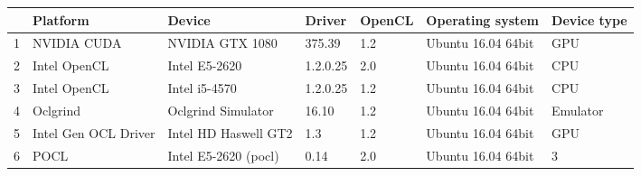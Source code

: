\begin{tabular}{lllllll}
\toprule
{} &              Platform &                Device &    Driver & OpenCL &    Operating system & Device type \\
\midrule
1 &           NVIDIA CUDA &       NVIDIA GTX 1080 &    375.39 &    1.2 &  Ubuntu 16.04 64bit &         GPU \\
2 &          Intel OpenCL &         Intel E5-2620 &  1.2.0.25 &    2.0 &  Ubuntu 16.04 64bit &         CPU \\
3 &          Intel OpenCL &         Intel i5-4570 &  1.2.0.25 &    1.2 &  Ubuntu 16.04 64bit &         CPU \\
4 &              Oclgrind &    Oclgrind Simulator &     16.10 &    1.2 &  Ubuntu 16.04 64bit &    Emulator \\
5 &  Intel Gen OCL Driver &  Intel HD Haswell GT2 &       1.3 &    1.2 &  Ubuntu 16.04 64bit &         GPU \\
6 &                  POCL &  Intel E5-2620 (pocl) &      0.14 &    2.0 &  Ubuntu 16.04 64bit &           3 \\
\bottomrule
\end{tabular}

